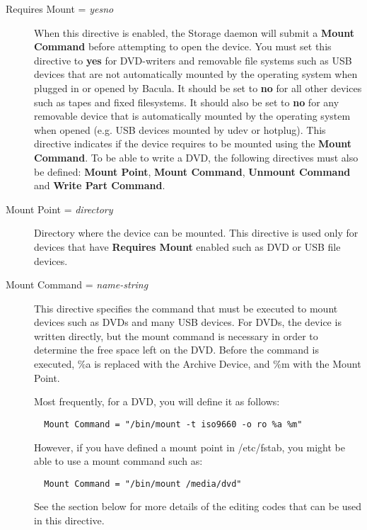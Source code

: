 \begin{description}
\item [Requires Mount = {\it yes\vb{}no}]
   When this directive is enabled, the Storage daemon will submit
   a {\bf Mount Command} before attempting to open the device.
   You must set this directive to {\bf yes} for DVD-writers and removable
   file systems such as USB devices that are not automatically mounted
   by the operating system when plugged in or opened by Bacula.
   It should be set to {\bf no} for
   all other devices such as tapes and fixed filesystems. It should also
   be set to {\bf no} for any removable device that is automatically
   mounted by the operating system when opened (e.g. USB devices mounted
   by udev or hotplug). This directive
   indicates if the device requires to be mounted using the {\bf Mount
   Command}.  To be able to write a DVD, the following directives must also
   be defined: {\bf Mount Point}, {\bf Mount Command}, {\bf Unmount
   Command} and {\bf Write Part Command}.

\item [Mount Point = {\it directory}]
   Directory where the device can be mounted. 
   This directive is used only
   for devices that have {\bf Requires Mount} enabled such as DVD or 
   USB file devices.

\item [Mount Command = {\it name-string}]
   This directive specifies the command that must be executed to mount 
   devices such as DVDs and many USB devices. For DVDs, the
   device is written directly, but the mount command is necessary in
   order to determine the free space left on the DVD. Before the command is 
   executed, \%a is replaced with the Archive Device, and \%m with the Mount 
   Point.

   Most frequently, for a DVD, you will define it as follows:  

\footnotesize
\begin{verbatim}
  Mount Command = "/bin/mount -t iso9660 -o ro %a %m"
\end{verbatim}
\normalsize

However, if you have defined a mount point in /etc/fstab, you might be
able to use a mount command such as:

\footnotesize
\begin{verbatim}
  Mount Command = "/bin/mount /media/dvd"
\end{verbatim}
\normalsize

See the  section below for more details of
the editing codes that can be used in this directive.


\end{description}
